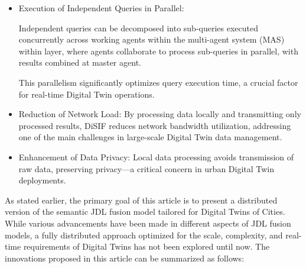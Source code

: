 \documentclass[5p,times]{elsarticle}
\begin{document}
   \begin{itemize}

   \item Execution of Independent Queries in Parallel: 
   
   Independent queries can be decomposed into sub-queries executed 
   concurrently across working agents within the multi-agent system (MAS) within layer,
    where agents collaborate to process sub-queries in parallel, 
    with results combined at master agent.

   This parallelism significantly optimizes query execution time, a crucial factor for real-time
 Digital Twin operations.

 \item Reduction of Network Load: By processing data locally
 and transmitting only processed results, DiSIF reduces
 network bandwidth utilization, addressing one of the main
 challenges in large-scale Digital Twin data management.
 
 \item Enhancement of Data Privacy: Local data processing
 avoids transmission of raw data, preserving privacy—a
 critical concern in urban Digital Twin deployments.

   \end{itemize}


   As stated earlier, the primary goal of this article is to present
 a distributed version of the semantic JDL fusion model tailored
 for Digital Twins of Cities. While various advancements have
 been made in different aspects of JDL fusion models, a fully
 distributed approach optimized for the scale, complexity, and
 real-time requirements of Digital Twins has not been explored
 until now. The innovations proposed in this article can be summarized as follows:
\end{document}
